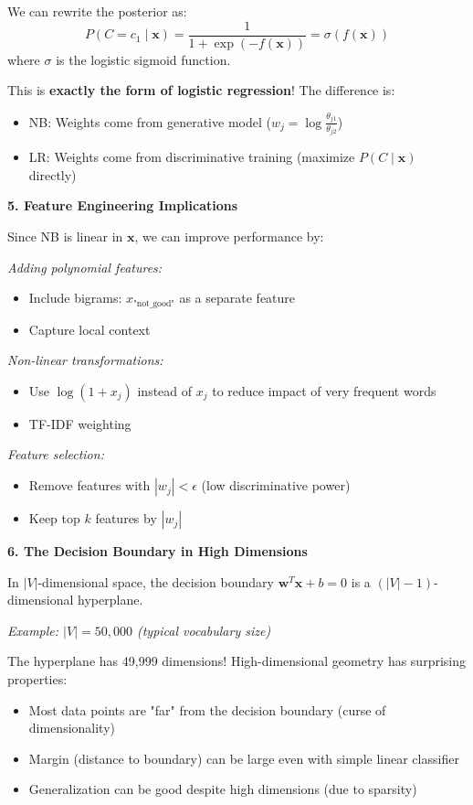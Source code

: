 \documentclass[12pt]{article}
\begin{document}
\begin{explanation}
We can rewrite the posterior as:
\[
P(C = c_1 \mid \mathbf{x}) = \frac{1}{1 + \exp(-f(\mathbf{x}))} = \sigma(f(\mathbf{x}))
\]
where $\sigma$ is the logistic sigmoid function.

This is \textbf{exactly the form of logistic regression}! The difference is:
\begin{itemize}
    \item NB: Weights come from generative model ($w_j = \log \frac{\theta_{j1}}{\theta_{j2}}$)
    \item LR: Weights come from discriminative training (maximize $P(C \mid \mathbf{x})$ directly)
\end{itemize}

\textbf{5. Feature Engineering Implications}

Since NB is linear in $\mathbf{x}$, we can improve performance by:

\textit{Adding polynomial features:}
\begin{itemize}
    \item Include bigrams: $x_{\text{"not\_good"}}$ as a separate feature
    \item Capture local context
\end{itemize}

\textit{Non-linear transformations:}
\begin{itemize}
    \item Use $\log(1 + x_j)$ instead of $x_j$ to reduce impact of very frequent words
    \item TF-IDF weighting
\end{itemize}

\textit{Feature selection:}
\begin{itemize}
    \item Remove features with $|w_j| < \epsilon$ (low discriminative power)
    \item Keep top $k$ features by $|w_j|$
\end{itemize}

\textbf{6. The Decision Boundary in High Dimensions}

In $|V|$-dimensional space, the decision boundary $\mathbf{w}^T \mathbf{x} + b = 0$ is a $(|V|-1)$-dimensional hyperplane.

\textit{Example: $|V| = 50{,}000$ (typical vocabulary size)}

The hyperplane has 49,999 dimensions! High-dimensional geometry has surprising properties:
\begin{itemize}
    \item Most data points are "far" from the decision boundary (curse of dimensionality)
    \item Margin (distance to boundary) can be large even with simple linear classifier
    \item Generalization can be good despite high dimensions (due to sparsity)
\end{itemize}


\end{explanation}
\end{document}
